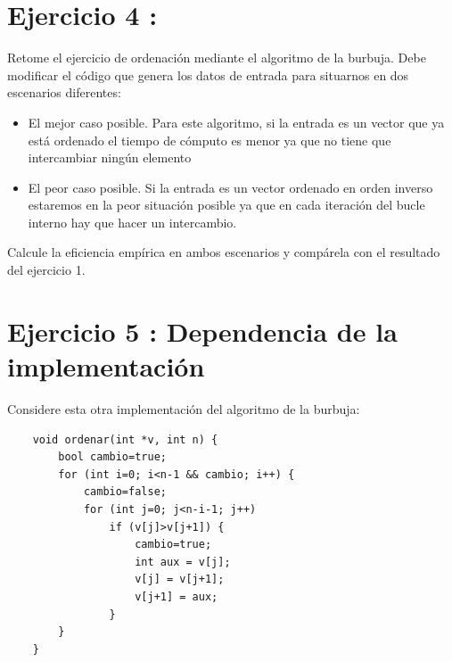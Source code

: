 \documentclass{article}
\begin{document}
\clearpage
\section{Ejercicio 4 :}
Retome el ejercicio de ordenación mediante el algoritmo de la burbuja. Debe modificar el
código que genera los datos de entrada para situarnos en dos escenarios diferentes:
\begin{itemize}
	\item El mejor caso posible. Para este algoritmo, si la entrada es un vector que ya está ordenado el tiempo de cómputo es menor ya que no tiene que intercambiar ningún elemento
	\item El peor caso posible. Si la entrada es un vector ordenado en orden inverso estaremos en la peor situación posible ya que en cada iteración del bucle interno hay que hacer un intercambio.
\end{itemize}
	Calcule la eficiencia empírica en ambos escenarios y compárela con el resultado del ejercicio 1.
\clearpage
\section{Ejercicio 5 : Dependencia de la implementación}
Considere esta otra implementación del algoritmo de la burbuja:
\begin{lstlisting}
	void ordenar(int *v, int n) {
		bool cambio=true;
		for (int i=0; i<n-1 && cambio; i++) {
			cambio=false;
			for (int j=0; j<n-i-1; j++)
				if (v[j]>v[j+1]) {
					cambio=true;
					int aux = v[j];
					v[j] = v[j+1];
					v[j+1] = aux;
				}
		}
	}
\end{lstlisting}
\end{document}
